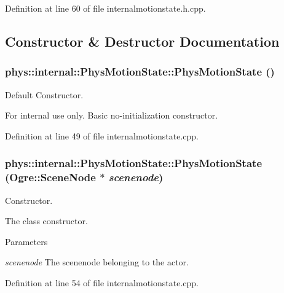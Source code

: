 Definition at line 60 of file internalmotionstate.h.cpp.



\subsection{Constructor \& Destructor Documentation}
\hypertarget{classphys_1_1internal_1_1PhysMotionState_a64d423e8d2ccec0c7acce7701c898dd0}{
\subsubsection[{PhysMotionState}]{\setlength{\rightskip}{0pt plus 5cm}phys::internal::PhysMotionState::PhysMotionState ()}}
\label{dc/df8/classphys_1_1internal_1_1PhysMotionState_a64d423e8d2ccec0c7acce7701c898dd0}


Default Constructor. 

\begin{DoxyInternal}{For internal use only.}
Basic no-\/initialization constructor. \end{DoxyInternal}


Definition at line 49 of file internalmotionstate.cpp.

\hypertarget{classphys_1_1internal_1_1PhysMotionState_a604ffb6d4d121ec548d780a515f77dc6}{
\subsubsection[{PhysMotionState}]{\setlength{\rightskip}{0pt plus 5cm}phys::internal::PhysMotionState::PhysMotionState (Ogre::SceneNode $\ast$ {\em scenenode})}}
\label{dc/df8/classphys_1_1internal_1_1PhysMotionState_a604ffb6d4d121ec548d780a515f77dc6}


Constructor. 

The class constructor. 
\begin{DoxyParams}{Parameters}
\item[{\em scenenode}]The scenenode belonging to the actor. \end{DoxyParams}


Definition at line 54 of file internalmotionstate.cpp.

